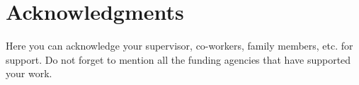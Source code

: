 \chapter*{Acknowledgments}

\begin{justify}
    Here you can acknowledge your supervisor, co-workers, family members, etc. for support.  Do not forget to mention all the funding agencies that have supported your work.
\end{justify}

\clearpage